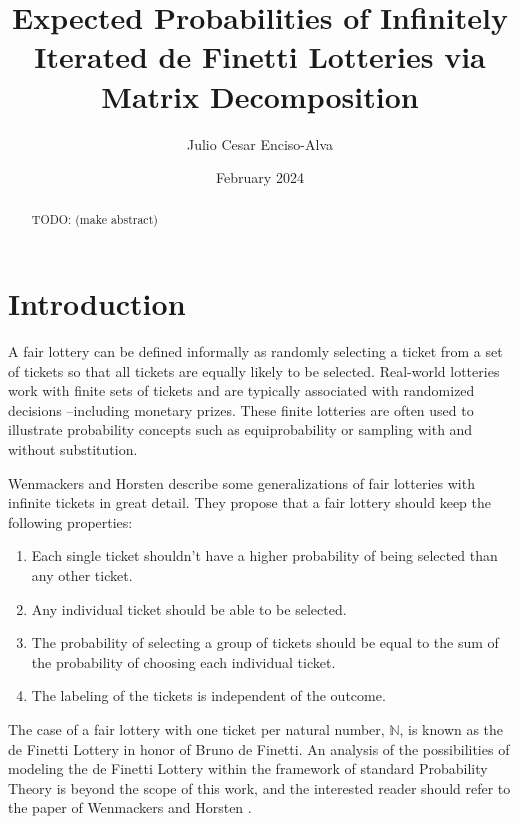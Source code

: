 \documentclass{article}
\title{Expected Probabilities of Infinitely Iterated de Finetti Lotteries via Matrix Decomposition}
\author{Julio Cesar Enciso-Alva}
\date{February 2024}
\newcommand{\N}{\mathbb{N}}
\begin{document}
\maketitle

\begin{abstract}
    TODO: (make abstract)
\end{abstract}


\section{Introduction}

A fair lottery can be defined informally as randomly selecting a ticket from a set of tickets so that all tickets are equally likely to be selected. 
%
Real-world lotteries work with finite sets of tickets and are typically associated with randomized decisions --including monetary prizes. 
%
These finite lotteries are often used to illustrate probability concepts such as equiprobability or sampling with and without substitution.

Wenmackers and Horsten \cite{fair_infinite_lottery} describe some generalizations of fair lotteries with infinite tickets in great detail.
%
They propose that a fair lottery should keep the following properties:
\begin{enumerate}
    \item Each single ticket shouldn't have a higher probability of being selected than any other ticket.
    \item Any individual ticket should be able to be selected.
    \item The probability of selecting a group of tickets should be equal to the sum of the probability of choosing each individual ticket.
    \item The labeling of the tickets is independent of the outcome.
\end{enumerate}

The case of a fair lottery with one ticket per natural number, $\N$, is known as the de Finetti Lottery in honor of Bruno de Finetti.
%
An analysis of the possibilities of modeling the de Finetti Lottery within the framework of standard Probability Theory is beyond the scope of this work, and the interested reader should refer to the paper of Wenmackers and Horsten \cite{fair_infinite_lottery}.
\end{document}
